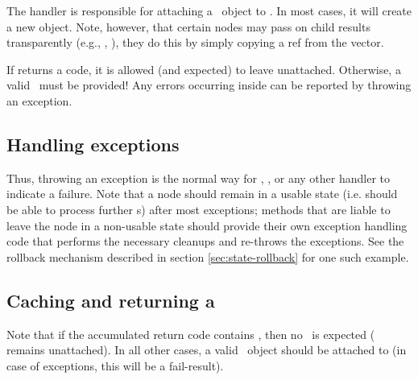  The  handler is responsible for attaching a \Result\ object
  to . In most cases, it will create a new object. Note, however,
  that certain nodes may pass on child results transparently (e.g.,
  , ), they do this by simply copying a ref from the
   vector. 
  
  If  returns a  code, it is allowed (and expected)
  to leave  unattached. Otherwise, a valid \Result\ must be
  provided! Any errors occurring inside  can be reported by
  throwing an exception.

\subsection{Handling exceptions}


  Thus, throwing an exception is the normal way for ,
  , or any other handler to indicate a failure. Note that a
  node should remain in a usable state (i.e. should be able to process further
  \Request{}s) after most exceptions; methods that are liable to leave the node
  in a non-usable state should provide their own exception handling code that
  performs the necessary cleanups and re-throws the exceptions. See the
   rollback mechanism described in section
  \ref{sec:state-rollback} for one such example.

\subsection{Caching and returning a \Result}
\label{sec:execute-return}
 

  Note that if the accumulated return code contains , then no
  \Result\ is expected ( remains unattached). In all other cases, a
  valid \Result\ object should be attached to  (in case of
  exceptions, this will be a fail-result).

